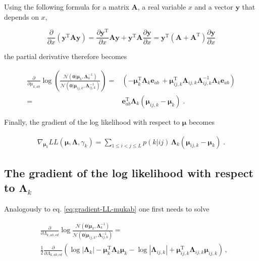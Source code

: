 \documentclass[12pt,a4paper,twoside]{book}
\newcommand{\Gauss}{\mathcal{N}}
\newcommand{\Lijk}{\mathbf{\Lambda}_{ij,k}}
\newcommand{\Lk}{\mathbf{\Lambda}_k}
\newcommand{\muijk}{\mathbf{\mu}_{ij,k}}
\newcommand{\muk}{\mathbf{\mu}_k}
\theoremstyle{definition}
\theoremstyle{definition}
\theoremstyle{remark}
\begin{document}
Using the following formula for a matrix \(\mathbf{A}\), a real variable
\(x\) and a vector \(\mathbf{y}\) that depends on \(x\),

\begin{equation}
    \frac{\partial}{\partial x} \left( \mathbf{y}^\mathrm{T} \mathbf{A} \mathbf{y} \right) = \frac{\partial \mathbf{y}^\mathrm{T}}{\partial x}  \mathbf{A} \mathbf{y} + \mathbf{y}^\mathrm{T} \mathbf{A} \frac{\partial \mathbf{y}}{\partial x}  =  \mathbf{y}^\mathrm{T} (\mathbf{A} + \mathbf{A}^\mathrm{T}) \frac{\partial \mathbf{y}}{\partial x} 
\label{eq:matrix-gradient}
\end{equation}

the partial derivative therefore becomes

\begin{align}
     \frac{\partial}{\partial \mu_{k,ab}} \log \left( \frac{ \Gauss(\mathbf{0} | \muk, \Lk^{-1})}{\Gauss( \mathbf{0} | \muijk, \Lijk^{-1})} \right)
    =& \left( -\muk^\mathrm{T} \Lk \mathbf{e}_{ab} \, +  \muijk^\mathrm{T} \Lijk \Lijk^{-1} \Lk \mathbf{e}_{ab} \right) \\
    =& \mathbf{e}^\mathrm{T}_{ab} \Lk ( \muijk - \muk ) \; . 
\end{align}

Finally, the gradient of the log likelihood with respect to
\(\mathbf{\mu}\) becomes

\begin{align}
    \nabla_{\muk} L\!L(\mathbf{\mu}, \mathbf{\Lambda}, \gamma_k)
    =  \sum_{1\le i<j\le L}  p(k|ij)  \,  \Lk \left(  \muijk  - \muk \right) \; .
\label{eq:gradient-muk-final}
\end{align}

\subsection{\texorpdfstring{The gradient of the log likelihood with
respect to
\(\Lk\)}{The gradient of the log likelihood with respect to \textbackslash{}Lk}}\label{the-gradient-of-the-log-likelihood-with-respect-to-lk}

Analogously to eq. \eqref{eq:gradient-LL-mukab} one first needs to solve

\begin{align}
     & \frac{\partial}{\partial \Lambda_{k,ab,cd}} \log \frac{\Gauss( \mathbf{0} | \muk, \Lk^{-1})}{\Gauss( \mathbf{0} | \muijk, \Lijk^{-1})} 
    = \\
    &\frac{1}{2}  \frac{\partial}{\partial \Lambda_{k,ab,cd}}  \left( \log |\Lk| - \muk^\mathrm{T} \Lk \muk - \log |\Lijk| + \muijk^\mathrm{T} \Lijk \muijk \right) \,,
\label{eq:grad-log-N-N-lambdakabcd}
\end{align}
\end{document}
